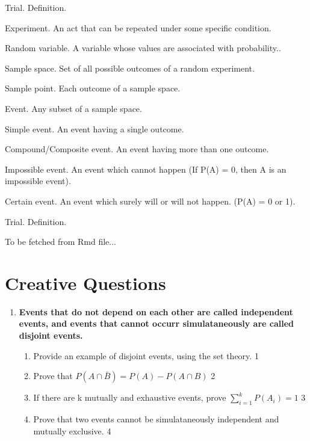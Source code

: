 \documentclass[14pt, a4paper,oneside, margin=1.4in]{book}
\begin{document}
\begin{worddefs}
  \item[Trial.] Definition.
  
  \item[Experiment.] An act that can be repeated under some specific condition.
  
    
  \item[Random variable.] A variable whose values are associated with probability..
  
    
  \item[Sample space.] Set of all possible outcomes of a random experiment.
  
    
  \item[Sample point.]  Each outcome of a sample space.
  
    
  \item[Event.] Any subset of a sample space.
  
    
  \item[Simple event.] An event having a single outcome.
  
    
  \item[Compound/Composite event.] An event having more than one outcome.
  
    
  \item[Impossible event.] An event which cannot happen (If P(A) = 0, then A is an impossible event).
  
    
  \item[Certain event.] An event which surely will or will not happen. (P(A) = 0 or 1).
  
    
  \item[Trial.] Definition.
  
    
\end{worddefs}

To be fetched from Rmd file...


\section{Creative Questions}

\begin{enumerate}

     \item
	  \textbf{Events that do not depend on each other are called independent events, and events that cannot occurr simulataneously are called disjoint events.} 
  
  \begin{enumerate}
    \item
	Provide an example of disjoint events, using the set theory. \hfill 1
    \item
	Prove that $P(A\cap \bar B) = P(A) - P(A\cap B)$ \hfill 2
    \item  
	If there are k mutually and exhaustive events, prove $\displaystyle \sum_{i=1}^k P(A_i) = 1$ \hfill 3
    \item
	Prove that two events cannot be simulataneously independent and mutually exclusive. \hfill 4
  \end{enumerate}
    \end{enumerate}
    
\end{document}
